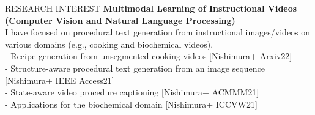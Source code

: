 \begin{rSection}{RESEARCH INTEREST}
{\bf Multimodal Learning of Instructional Videos (Computer Vision and Natural Language Processing)}
\\
I have focused on procedural text generation from instructional images/videos on various domains (e.g., cooking and biochemical videos). \\
- Recipe generation from unsegmented cooking videos [Nishimura+ Arxiv22] \\
- Structure-aware procedural text generation from an image sequence [Nishimura+ IEEE Access21] \\
- State-aware video procedure captioning [Nishimura+ ACMMM21] \\
- Applications for the biochemical domain [Nishimura+ ICCVW21]
\end{rSection}